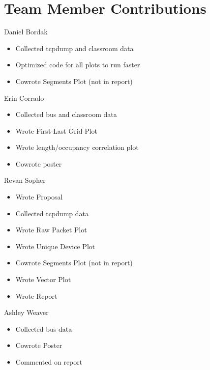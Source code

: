 \documentclass[letterpaper,abstract=on,titlepage=false]{scrreprt}
\begin{document}
\chapter*{Team Member Contributions}
Daniel Bordak
\begin{itemize}
  \item Collected tcpdump and classroom data
  \item Optimized code for all plots to run faster
  \item Cowrote Segments Plot (not in report)
\end{itemize}
Erin Corrado
\begin{itemize}
  \item Collected bus and classroom data
  \item Wrote First-Last Grid Plot
  \item Wrote length/occupancy correlation plot
  \item Cowrote poster
\end{itemize}
Revan Sopher
\begin{itemize}
  \item Wrote Proposal
  \item Collected tcpdump data
  \item Wrote Raw Packet Plot
  \item Wrote Unique Device Plot
  \item Cowrote Segments Plot (not in report)
  \item Wrote Vector Plot
  \item Wrote Report
\end{itemize}
Ashley Weaver
\begin{itemize}
  \item Collected bus data
  \item Cowrote Poster
  \item Commented on report
\end{itemize}
\end{document}
